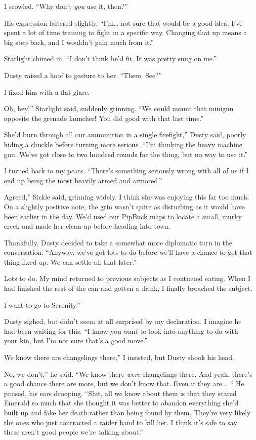 I scowled. “Why don’t \textit{you} use it, then?”

His expression faltered slightly. “I’m… not sure that would be a good idea. I’ve spent a lot of time training to fight in a specific way. Changing that up means a big step back, and I wouldn’t gain much from it.”

Starlight chimed in. “I don’t think he’d fit. It was pretty snug on me.”

Dusty raised a hoof to gesture to her. “There. See?”

I fixed him with a flat glare.

\leavevmode{}Oh, hey!” Starlight said, suddenly grinning. “We could mount that minigun opposite the grenade launcher! You did good with that last time.”

\leavevmode{}She’d burn through all our ammunition in a single firefight,” Dusty said, poorly hiding a chuckle before turning more serious. “I’m thinking the heavy machine gun. We’ve got close to two hundred rounds for the thing, but no way to use it.”

I turned back to my pears. “There’s something seriously wrong with all of us if I end up being the most heavily armed and armored.”

\leavevmode{}Agreed,” Sickle said, grinning widely. I think she was enjoying this far too much. On a slightly positive note, the grin wasn’t quite as disturbing as it would have been earlier in the day. We’d used our PipBuck maps to locate a small, murky creek and made her clean up before heading into town.

Thankfully, Dusty decided to take a somewhat more diplomatic turn in the conversation. “Anyway, we’ve got lots to do before we’ll have a chance to get that thing fixed up. We can settle all that later.”

Lots to do. My mind returned to previous subjects as I continued eating. When I had finished the rest of the can and gotten a drink, I finally broached the subject.

\leavevmode{}I want to go to Serenity.”

Dusty sighed, but didn’t seem at all surprised by my declaration. I imagine he had been waiting for this. “I know you want to look into anything to do with your kin, but I’m not sure that’s a good move.”

\leavevmode{}We know there are changelings there,” I insisted, but Dusty shook his head.

\leavevmode{}No, we don’t,” he said. “We know there \textit{were} changelings there. And yeah, there’s a good chance there are more, but we don’t know that. Even if they are... “ He paused, his ears drooping. “Shit, all we know about them is that they scared Emerald so much that she thought it was better to abandon everything she’d built up and fake her death rather than being found by them. They’re very likely the ones who just contracted a raider band to kill her. I think it’s safe to say these aren’t good people we’re talking about.”

